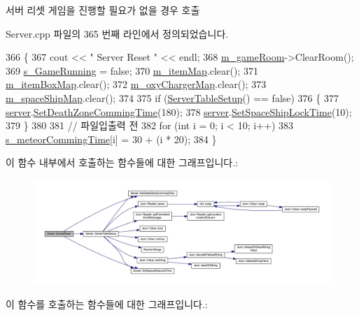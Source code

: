 서버 리셋  게임을 진행할 필요가 없을 경우 호출 

Server.\+cpp 파일의 365 번째 라인에서 정의되었습니다.


\begin{DoxyCode}
366 \{
367     cout << \textcolor{stringliteral}{" Server Reset "} << endl;
368     \hyperlink{class_server_a77f414d5bb41dd5de8626d8cd621113c}{m\_gameRoom}->ClearRoom();
369     \hyperlink{_server_8cpp_a0e468d42ed25075707dd9738b1b67621}{s\_GameRunning} = \textcolor{keyword}{false};
370     \hyperlink{class_server_a892047fc49e676067b880f31d0d22c36}{m\_itemMap}.clear();
371     \hyperlink{class_server_a4212564accb77fd496f08ff3ec292657}{m\_itemBoxMap}.clear();
372     \hyperlink{class_server_ae2e40fd2b3d85dd1c92ab7bc6e6b7d65}{m\_oxyChargerMap}.clear();
373     \hyperlink{class_server_aa20a2aa16045180559ef43a7087e7e95}{m\_spaceShipMap}.clear();
374 
375     \textcolor{keywordflow}{if} (\hyperlink{class_server_a2ea82221dd5edd72b97a465a9753a68e}{ServerTableSetup}() == \textcolor{keyword}{false})
376     \{
377         \hyperlink{_server_8cpp_afd1a82c786509e03b540bae82af2c137}{server}.\hyperlink{class_server_a0c817a017f9b2cb6f92de01e693b8e35}{SetDeathZoneCommingTime}(180);
378         \hyperlink{_server_8cpp_afd1a82c786509e03b540bae82af2c137}{server}.\hyperlink{class_server_a3866f3d6a99358d0068cee3d5bc529d2}{SetSpaceShipLockTime}(10);
379     \}
380 
381     \textcolor{comment}{// 파일입출력 전}
382     \textcolor{keywordflow}{for} (\textcolor{keywordtype}{int} i = 0; i < 10; i++)
383         \hyperlink{_server_8h_a406278daaf52b57f6349fc4941ecbc1e}{s\_meteorCommingTime}[i] = 30 + (i * 20);
384 \}
\end{DoxyCode}
이 함수 내부에서 호출하는 함수들에 대한 그래프입니다.\+:
\nopagebreak
\begin{figure}[H]
\begin{center}
\leavevmode
\includegraphics[width=350pt]{class_server_a88d53d3c77d90f211f3ca7cc51735171_cgraph}
\end{center}
\end{figure}
이 함수를 호출하는 함수들에 대한 그래프입니다.\+:\nopagebreak
